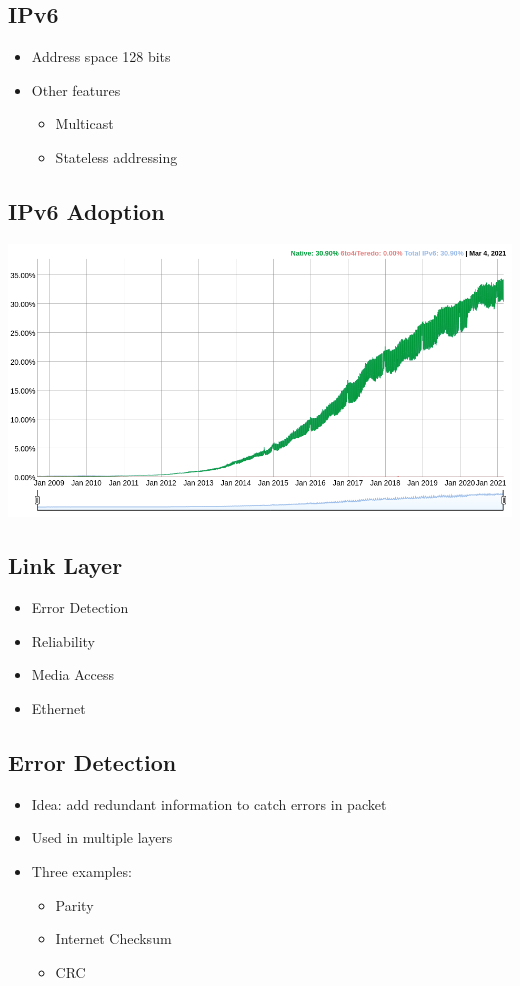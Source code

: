 \subsection{IPv6}
\begin{itemize}
    \item Address space 128 bits
    \item Other features
          \begin{itemize}
              \item Multicast
              \item Stateless addressing
          \end{itemize}
\end{itemize}

\subsection{IPv6 Adoption}
\includegraphics[scale=0.5]{lazy/ipv6adoption.png}

\subsection{Link Layer}
\begin{itemize}
    \item Error Detection
    \item Reliability
    \item Media Access
    \item Ethernet
\end{itemize}

\subsection{Error Detection}
\begin{itemize}
    \item Idea: add redundant information to catch errors in packet
    \item Used in multiple layers
    \item Three examples:
          \begin{itemize}
              \item Parity
              \item Internet Checksum
              \item CRC
          \end{itemize}
\end{itemize}


